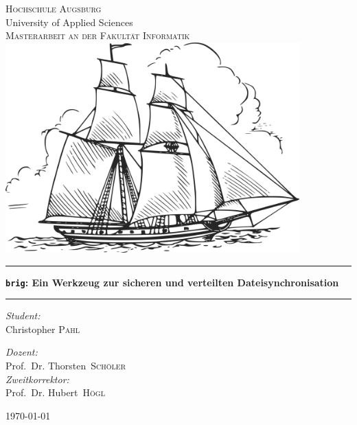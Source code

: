 \begin{titlepage}
\pagecolor{titlepagecolor}
\begin{center}

\color{titlepagefontcolor}
\textsc{\huge Hochschule Augsburg}\\[0.2cm]
\large University of Applied Sciences\\[1cm]
\textsc{\LARGE Masterarbeit an der Fakultät Informatik}\\[0.5cm]
\vspace{1em}
\includegraphics[width=0.85\textwidth]{images/title.png}~\\[1cm]

\rule{\linewidth}{0.5mm}

{\vspace{0.1cm}\Huge\bfseries \frqq\texttt{brig}: Ein Werkzeug zur sicheren und verteilten Dateisynchronisation\flqq\\[0.3cm]}
\rule{\linewidth}{0.5mm}

\vspace{0.5cm}

\noindent
\begin{minipage}[t]{0.4\textwidth}
\begin{flushleft} \Large
\emph{Student:}\\
\textnormal{Christopher \textsc{Pahl}} \\
\end{flushleft}
\end{minipage}%
\begin{minipage}[t]{0.4\textwidth}
\begin{flushright} \Large
\emph{Dozent:} \\
\textnormal{Prof.\ Dr. Thorsten\  \textsc{Schöler}} \\
\vspace{1em}
\emph{Zweitkorrektor:} \\
\textnormal{Prof.\ Dr. Hubert\  \textsc{Högl}} \\
\end{flushright}
\end{minipage}

\vfill

{\large \today}
\end{center}
\end{titlepage}
